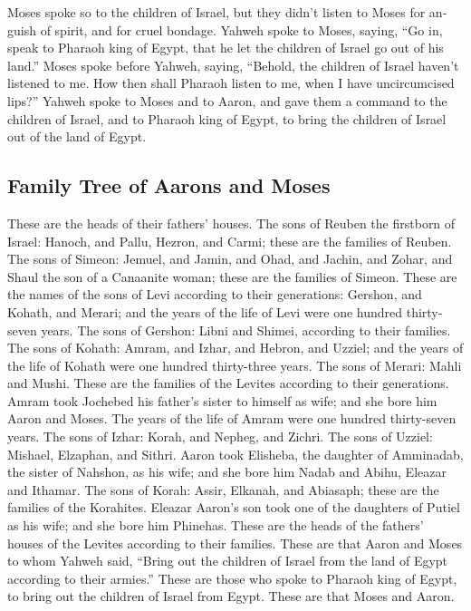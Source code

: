 \begin{paracol}{2}
\begin{otherlanguage}{english}
 Moses spoke so to the children of Israel, but they didn't
listen to Moses for anguish of spirit, and for cruel bondage.
 Yahweh spoke to Moses, saying,  ``Go in,
speak to Pharaoh king of Egypt, that he let the children of Israel go
out of his land.''  Moses spoke before Yahweh, saying,
``Behold, the children of Israel haven't listened to me. How then shall
Pharaoh listen to me, when I have uncircumcised lips?'' 
Yahweh spoke to Moses and to Aaron, and gave them a command to the
children of Israel, and to Pharaoh king of Egypt, to bring the children
of Israel out of the land of Egypt.

\hypertarget{family-tree-of-aarons-and-moses}{%
\subsection{Family Tree of Aarons and
Moses}\label{family-tree-of-aarons-and-moses}}

 These are the heads of their fathers' houses. The sons
of Reuben the firstborn of Israel: Hanoch, and Pallu, Hezron, and Carmi;
these are the families of Reuben.  The sons of Simeon:
Jemuel, and Jamin, and Ohad, and Jachin, and Zohar, and Shaul the son of
a Canaanite woman; these are the families of Simeon. 
These are the names of the sons of Levi according to their generations:
Gershon, and Kohath, and Merari; and the years of the life of Levi were
one hundred thirty-seven years.  The sons of Gershon:
Libni and Shimei, according to their families.  The sons
of Kohath: Amram, and Izhar, and Hebron, and Uzziel; and the years of
the life of Kohath were one hundred thirty-three years. 
The sons of Merari: Mahli and Mushi. These are the families of the
Levites according to their generations.  Amram took
Jochebed his father's sister to himself as wife; and she bore him Aaron
and Moses. The years of the life of Amram were one hundred thirty-seven
years.  The sons of Izhar: Korah, and Nepheg, and Zichri.
 The sons of Uzziel: Mishael, Elzaphan, and Sithri.
 Aaron took Elisheba, the daughter of Amminadab, the
sister of Nahshon, as his wife; and she bore him Nadab and Abihu,
Eleazar and Ithamar.  The sons of Korah: Assir, Elkanah,
and Abiasaph; these are the families of the Korahites. 
Eleazar Aaron's son took one of the daughters of Putiel as his wife; and
she bore him Phinehas. These are the heads of the fathers' houses of the
Levites according to their families.  These are that
Aaron and Moses to whom Yahweh said, ``Bring out the children of Israel
from the land of Egypt according to their armies.'' 
These are those who spoke to Pharaoh king of Egypt, to bring out the
children of Israel from Egypt. These are that Moses and Aaron.


\end{otherlanguage}
\end{paracol}
